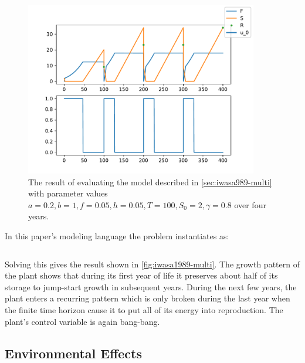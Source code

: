 \documentclass{article}
\begin{document}
\begin{figure}
\centering
\includegraphics[width=4in]{imgs/Iwasa1989_multi_season.pdf}
\caption{The result of evaluating the model described in \autoref{sec:iwasa989-multi} with parameter values $a=0.2, b=1, f=0.05, h=0.05, T=100, S_0=2, \gamma=0.8$ over four years. \label{fig:iwasa1989-multi}}
\end{figure}

In this paper's modeling language the problem instantiates as:

\inputminted[firstline=3,frame=single,linenos]{python}{src/Iwasa1989_multi_season.py}

Solving this gives the result shown in \autoref{fig:iwasa1989-multi}. The growth pattern of the plant shows that during its first year of life it preserves about half of its storage to jump-start growth in subsequent years. During the next few years, the plant enters a recurring pattern which is only broken during the last year when the finite time horizon cause it to put all of its energy into reproduction. The plant's control variable is again bang-bang.




\subsection{Environmental Effects}
\end{document}
